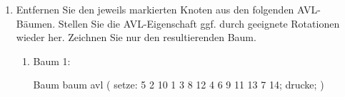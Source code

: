 \documentclass{bschlangaul-aufgabe}
\begin{document}
\begin{enumerate}
\begin{bAntwort}
\bLinie

\begin{bBaum}{Nach dem Einfügen von „8“}
\end{bBaum}

\begin{bBaum}{Nach der Linksrotation}
\end{bBaum}

\begin{bBaum}{Nach dem Einfügen von „4“}
\end{bBaum}
\end{bAntwort}


\item Entfernen Sie den jeweils markierten Knoten aus den folgenden
AVL-Bäumen. Stellen Sie die AVL-Eigenschaft ggf. durch geeignete
Rotationen wieder her. Zeichnen Sie nur den resultierenden Baum.

\begin{enumerate}


\item Baum 1:

\begin{bProjektSprache}{Baum}
baum avl (
  setze: 5 2 10 1 3 8 12 4 6 9 11 13 7 14;
  drucke;
)
\end{bProjektSprache}


\end{enumerate}
\end{enumerate}
\end{document}
